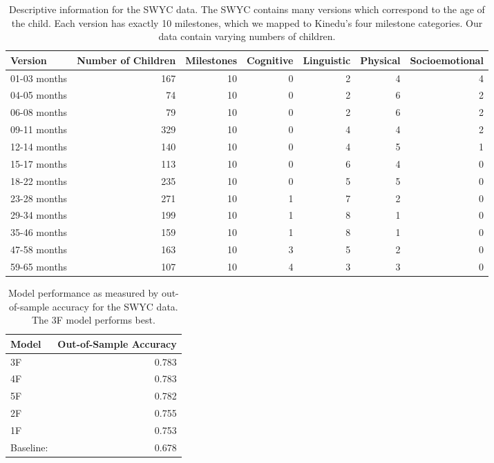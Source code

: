 \documentclass[11pt]{article}
\begin{document}
\begin{table}[ht]
\centering
\caption{\label{tab:swyc}Descriptive information for the SWYC data. The SWYC contains many versions which correspond to the age of the child. Each version has exactly 10 milestones, which we mapped to Kinedu's four milestone categories. Our data contain varying numbers of children.}
\begin{tabular}{lrrrrrr}
  \hline
Version & Number of Children & Milestones & Cognitive & Linguistic & Physical & Socioemotional\\
  \hline
  01-03 months & 167 &  10 &   0 &   2 &   4 &   4\\
  04-05 months &  74 &  10 &   0 &   2 &   6 &   2\\
  06-08 months &  79 &  10 &   0 &   2 &   6 &   2\\
  09-11 months & 329 &  10 &   0 &   4 &   4 &   2\\
  12-14 months & 140 &  10 &   0 &   4 &   5 &   1\\
  15-17 months & 113 &  10 &   0 &   6 &   4 &   0\\
  18-22 months & 235 &  10 &   0 &   5 &   5 &   0\\
  23-28 months & 271 &  10 &   1 &   7 &   2 &   0\\
  29-34 months & 199 &  10 &   1 &   8 &   1 &   0\\
  35-46 months & 159 &  10 &   1 &   8 &   1 &   0\\
  47-58 months & 163 &  10 &   3 &   5 &   2 &   0\\
  59-65 months & 107 &  10 &   4 &   3 &   3 &   0\\
   \hline
\end{tabular}
\end{table}

\begin{table}[ht]
\centering
\caption{\label{tab:swycresults}Model performance as measured by out-of-sample accuracy for the SWYC data. The 3F model performs best.}
\begin{tabular}{lr}
  \hline
Model & Out-of-Sample Accuracy\\
  \hline
  3F & 0.783\\
  4F & 0.783\\
  5F & 0.782\\
  2F & 0.755\\
  1F & 0.753\\
  Baseline: & 0.678\\
   \hline
\end{tabular}
\end{table}
\end{document}
